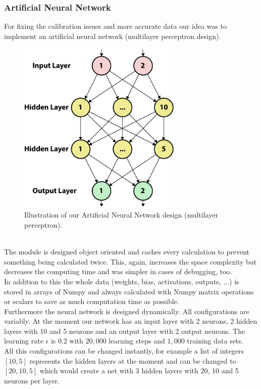 \documentclass[lnicst,a4paper]{svmultln}
\begin{document}
\subsubsection{Artificial Neural Network}
For fixing the calibration issues and more accurate data our idea was to implement an artificial neural network (multilayer perceptron design).
\\
\begin{figure}
 	\centerline{\includegraphics[width=0.7\textwidth]{neuralnet1.pdf}}
	{\caption{Illustration of our Artificial Neural Network design (multilayer perceptron).}\label{fig:ann_illustration1}}
\end{figure}
\\
The module is designed object oriented and caches every calculation to prevent something being calculated twice. This, again, increases the space complexity but decreases the computing time and was simpler in cases of debugging, too.
\\
In addition to this the whole data (weights, bias, activations, outputs, ...) is stored in arrays of Numpy and always calculated with Numpy matrix operations or scalars to save as much computation time as possible.
\\
Furthermore the neural network is designed dynamically. All configurations are variably. At the moment our network has an input layer with 2 neurons, 2 hidden layers with 10 and 5 neurons and an output layer with 2 output neurons. The learning rate $\epsilon$ is $0.2$ with $20,000$ learning steps and $1,000$ training data sets.
\\
All this configurations can be changed instantly, for example a list of integers $[10, 5]$ represents the hidden layers at the moment and can be changed to $[20, 10, 5]$ which would create a net with 3 hidden layers with 20, 10 and 5 neurons per layer.
\end{document}
